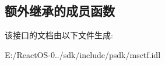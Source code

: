 \subsection*{额外继承的成员函数}


该接口的文档由以下文件生成\+:\begin{DoxyCompactItemize}
\item 
E\+:/\+React\+O\+S-\/0../sdk/include/psdk/msctf.\+idl\end{DoxyCompactItemize}
